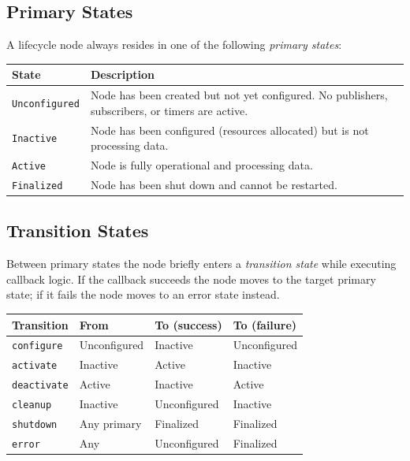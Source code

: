 \documentclass[11pt,a4paper]{csarticle}
\begin{document}
\subsection{Primary States}

A lifecycle node always resides in one of the following \emph{primary states}:

\begin{center}
\begin{tabular}{lp{9cm}}
  \toprule
  \textbf{State} & \textbf{Description} \\
  \midrule
  \texttt{Unconfigured} & Node has been created but not yet configured.
                           No publishers, subscribers, or timers are active. \\
  \texttt{Inactive}     & Node has been configured (resources allocated) but
                           is not processing data. \\
  \texttt{Active}       & Node is fully operational and processing data. \\
  \texttt{Finalized}    & Node has been shut down and cannot be restarted. \\
  \bottomrule
\end{tabular}
\end{center}

\subsection{Transition States}

Between primary states the node briefly enters a \emph{transition state}
while executing callback logic.  If the callback succeeds the node moves to
the target primary state; if it fails the node moves to an error state
instead.

\begin{center}
\begin{tabular}{llll}
  \toprule
  \textbf{Transition} & \textbf{From} & \textbf{To (success)} & \textbf{To (failure)} \\
  \midrule
  \texttt{configure}   & Unconfigured & Inactive     & Unconfigured \\
  \texttt{activate}    & Inactive     & Active       & Inactive \\
  \texttt{deactivate}  & Active       & Inactive     & Active \\
  \texttt{cleanup}     & Inactive     & Unconfigured & Inactive \\
  \texttt{shutdown}    & Any primary  & Finalized    & Finalized \\
  \texttt{error}       & Any          & Unconfigured & Finalized \\
  \bottomrule
\end{tabular}
\end{center}
\end{document}
